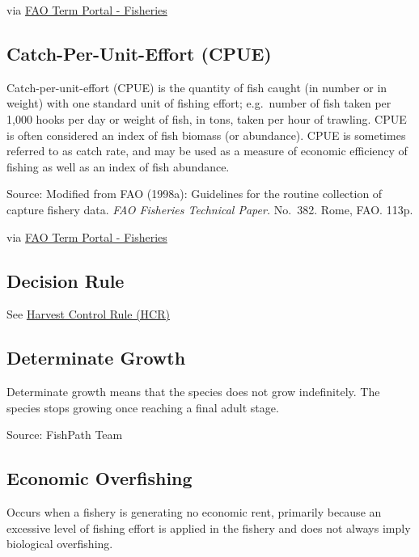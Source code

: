 \documentclass[
  11pt,
]{book}
\begin{document}
via \href{http://www.fao.org/fishery/glossary/en}{FAO Term Portal - Fisheries}

\hypertarget{catch-per-unit-effort-cpue}{%
\subsection{Catch-Per-Unit-Effort (CPUE)}\label{catch-per-unit-effort-cpue}}

Catch-per-unit-effort (CPUE) is the quantity of fish caught (in number or in weight) with one standard unit of fishing effort; e.g.~number of fish taken per 1,000 hooks per day or weight of fish, in tons, taken per hour of trawling. CPUE is often considered an index of fish biomass (or abundance). CPUE is sometimes referred to as catch rate, and may be used as a measure of economic efficiency of fishing as well as an index of fish abundance.

Source: Modified from FAO (1998a): Guidelines for the routine collection of capture fishery data. \emph{FAO Fisheries Technical Paper.} No.~382. Rome, FAO. 113p.

via \href{http://www.fao.org/fishery/glossary/en}{FAO Term Portal - Fisheries}

\hypertarget{decision-rule}{%
\subsection{Decision Rule}\label{decision-rule}}

See \protect\hyperlink{harvest-control-rule-hcr}{Harvest Control Rule (HCR)}

\hypertarget{determinate-growth}{%
\subsection{Determinate Growth}\label{determinate-growth}}

Determinate growth means that the species does not grow indefinitely. The species stops growing once reaching a final adult stage.

Source: FishPath Team

\hypertarget{economic-overfishing}{%
\subsection{Economic Overfishing}\label{economic-overfishing}}

Occurs when a fishery is generating no economic rent, primarily because an excessive level of fishing effort is applied in the fishery and does not always imply biological overfishing.
\end{document}
